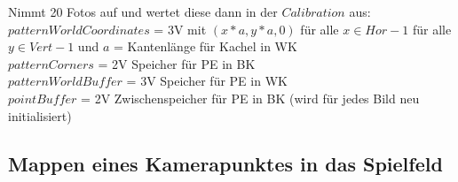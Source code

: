Nimmt 20 Fotos auf und wertet diese dann in der $Calibration$ aus:\\
$patternWorldCoordinates$ = 3V mit $(x*a,y*a,0)$ für alle $x \in Hor-1$ für alle $y \in Vert-1$ und $a$ = Kantenlänge für Kachel in WK\\
$patternCorners$ = 2V Speicher für PE in BK\\
$patternWorldBuffer$ = 3V Speicher für PE in WK\\
$pointBuffer$ = 2V Zwischenspeicher für PE in BK (wird für jedes Bild neu initialisiert)\\


\subsection{Mappen eines Kamerapunktes in das Spielfeld}



